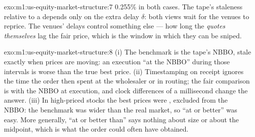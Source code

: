 \begin{solution}{exo:m1:us-equity-market-structure:7}
0.255\% in both cases. The tape's staleness relative to a  depends
only on the extra delay $\delta$: both views wait for the venues to reprice.
The venues' delays control something else --- how long the \emph{quotes
themselves} lag the fair price, which is the window in which they can be
sniped.
\end{solution}

\begin{solution}{exo:m1:us-equity-market-structure:8}
(i) The benchmark is the tape's NBBO, stale exactly when prices are moving:
an execution ``at the NBBO'' during those intervals is worse than the true
best price. (ii) Timestamping on receipt ignores the time the order then
spent at the wholesaler or in routing; the fair comparison is with the NBBO
at execution, and clock differences of a millisecond change the answer.
(iii) In high-priced stocks the best prices were , excluded from the
NBBO: the benchmark was wider than the real market, so ``at or better'' was
easy. More generally, ``at or better than'' says nothing about size or about
the midpoint, which is what the order could often have obtained.
\end{solution}

